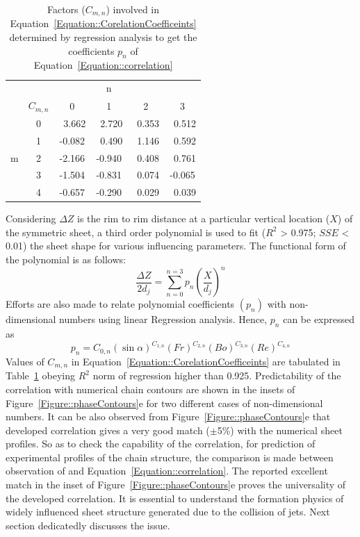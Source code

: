 \documentclass{jfm}
\begin{document}
\begin{table}
	\centering
	\begin{tabular}{@{}cccccc@{}}
		&&&n&&\\
		&$C_{m,n}$&0&1&2&3 \\
		&0&~3.662&~2.720&~0.353&~0.512\\
		&1&-0.082&~0.490&~1.146&~0.592\\
		m&2&-2.166&-0.940&~0.408&~0.761\\
		&3&-1.504&-0.831&~0.074&-0.065\\
		&4&-0.657&-0.290&~0.029&~0.039\\
	\end{tabular}
	\caption{Factors ($C_{m,n}$) involved in Equation~\ref{Equation::CorelationCoefficeints} determined by regression analysis to get the coefficients $p_n$ of Equation~\ref{Equation::correlation}}
	\label{Table::CorrelationPrams}
\end{table} 
Considering $\Delta Z$ is the rim to rim distance at a particular vertical location ($X$) of the symmetric sheet, a third order polynomial is used to fit ($R^2$ > 0.975; $SSE$ < 0.01) the sheet shape for various influencing parameters. The functional form of the polynomial is as follows: 
\begin{equation}\label{Equation::correlation}
\frac{\Delta Z}{2d_j} = \sum_{n = 0}^{n = 3}p_n\left(\frac{X}{d_j}\right)^n
\end{equation}
Efforts are also made to relate polynomial coefficients $\left(p_n\right)$ with non-dimensional numbers using linear Regression analysis. Hence, $p_n$ can be expressed as
\begin{equation}\label{Equation::CorelationCoefficeints}
p_n = C_{0,n}\left(\sin\alpha\right)^{C_{1,n}}\left(Fr\right)^{C_{2,n}}\left(Bo\right)^{C_{3,n}}\left(Re\right)^{C_{4,n}}
\end{equation}
Values of $C_{m,n}$ in Equation~\ref{Equation::CorelationCoefficeints} are tabulated in Table~\ref{Table::CorrelationPrams} obeying $R^2$ norm of regression higher than 0.925. Predictability of the correlation with numerical chain contours are shown in the insets of Figure~\ref{Figure::phaseContours}e for two different cases of non-dimensional numbers. It can be also observed from Figure~\ref{Figure::phaseContours}e that developed correlation gives a very good match ($\pm$5\%) with the numerical sheet profiles. So as to check the capability of the correlation, for prediction of experimental profiles of the chain structure, the comparison is made between observation of \cite{bush2004collision} and Equation~\ref{Equation::correlation}. The reported excellent match in the inset of Figure~\ref{Figure::phaseContours}e proves the universality of the developed correlation. It is essential to understand the formation physics of widely influenced sheet structure generated due to the collision of jets. Next section dedicatedly discusses the issue.
\end{document}
